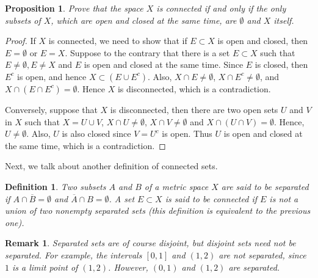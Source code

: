 \documentclass[10pt]{book}
\newtheorem{definition}{Definition}[chapter]
\newtheorem{proposition}{Proposition}[chapter]
\newtheorem{remark}{Remark}[chapter]
\theoremstyle{definition}
\numberwithin{equation}{chapter}
\begin{document}
\medskip

\begin{proposition}
Prove that the space $X$ is connected if and only if the only subsets of $X$, which are open and closed at the same time, are $\emptyset$ and $X$ itself.
\end{proposition}
\begin{proof}
If $X$ is connected, we need to show that if $E \subset X$ is open and closed, then $E = \emptyset$ or $E = X$. Suppose to the contrary that there is a set $E \subset X$ such that $E \neq \emptyset, E \neq X$ and $E$ is open and closed at the same time. Since $E$ is closed, then $E^c$ is open, and hence $X \subset (E \cup E^c)$. Also, $X \cap E \neq \emptyset$, $X \cap E^c \neq \emptyset$, and $X \cap (E \cap E^c) = \emptyset$. Hence $X$ is disconnected, which is a contradiction.

Conversely, suppose that $X$ is disconnected, then there are two open sets $U$ and $V$ in $X$ such that $X = U \cup V$, $X \cap U \neq \emptyset$, $X \cap V \neq \emptyset$ and $X \cap (U \cap V) = \emptyset$. Hence, $U \neq \emptyset$. Also, $U$ is also closed since $V = U^c$ is open. Thus $U$ is open and closed at the same time, which is a contradiction.
\end{proof}

\medskip

Next, we talk about another definition of connected sets.

\medskip

\begin{definition}
Two subsets $A$ and $B$ of a metric space $X$ are said to be separated if $A \cap \overline{B} = \emptyset$ and $\overline{A} \cap B = \emptyset$. A set $E \subset X$ is said to be connected if $E$ is not a union of two nonempty separated sets (this definition is equivalent to the previous one).
\end{definition}

\begin{remark}
Separated sets are of course disjoint, but disjoint sets need not be separated. For example, the intervals $[0,1]$ and $(1,2)$ are not separated, since $1$ is a limit point of $(1,2)$. However, $(0,1)$ and $(1,2)$ are separated.
\end{remark}

\medskip
\end{document}
